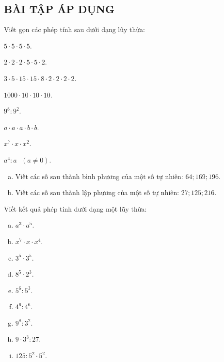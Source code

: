 \subsection{BÀI TẬP ÁP DỤNG}
\begin{bt}
Viết gọn các phép tính sau dưới dạng lũy thừa:
\begin{listEX}[2]
\item $5\cdot 5\cdot 5\cdot 5$. 
\item $2\cdot 2\cdot 2\cdot 5\cdot 5\cdot 2$.
\item $3\cdot 5\cdot 15\cdot 15\cdot8\cdot 2\cdot 2\cdot 2\cdot 2$.	
\item $1000\cdot 10\cdot 10\cdot 10$.
\item ${{9}^{8}}:{{9}^{2}}$.
\item  $a\cdot a\cdot a\cdot b\cdot b$.
\item  ${{x}^{7}}\cdot x\cdot {{x}^{2}}$. 	
\item ${{a}^{4}}:a\text{ }(a\ne 0)$.
\end{listEX} 
\end{bt}   \begin{bt}
\begin{enumerate}[a)]
\item Viết các số sau thành bình phương của một số tự nhiên: $64; 169; 196$.
\item Viết các số sau thành lập phương của một số tự nhiên: $27; 125; 216$.
\end{enumerate}
\end{bt}   \begin{bt}
Viết kết quả phép tính dưới dạng một lũy thừa:
\begin{multicols}{3}
\begin{enumerate}[a)]
\item ${{a}^{3}}\cdot {{a}^{5}}$.    
\item ${{x}^{7}}\cdot x\cdot {{x}^{4}}$. 
\item ${{3}^{5}}\cdot {{3}^{5}}$.
\item ${{8}^{5}}\cdot {{2}^{3}}$.
\item ${{5}^{6}}:{{5}^{3}}$.
\item ${{4}^{6}}:{{4}^{6}}$.       
\item ${{9}^{8}}:{{3}^{2}}$.
\item $9\cdot3^3:27$.
\item $125:5^2 \cdot 5^2$.
\end{enumerate}
\end{multicols}

\end{bt}

